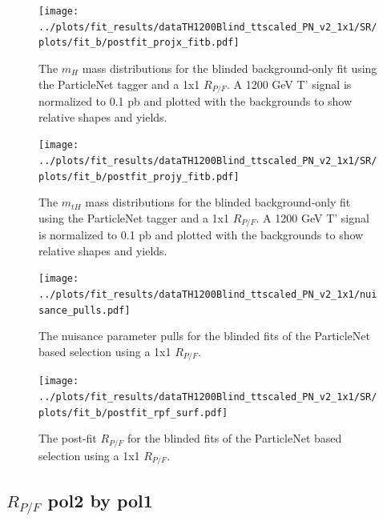 \documentclass[10pt,oneside]{article}
\begin{document}
\begin{figure}[H]
    \centering
    \texttt{[image: ../plots/fit\_results/dataTH1200Blind\_ttscaled\_PN\_v2\_1x1/SR/plots/fit\_b/postfit\_projx\_fitb.pdf]}
    \caption{The $m_H$ mass distributions for the blinded background-only fit using the ParticleNet tagger and a 1x1 $R_{P/F}$.
    A 1200 GeV T' signal is normalized to 0.1 pb and plotted with the backgrounds to show relative shapes and yields.}
    \label{figs:PN_mh_1x1}
\end{figure}
\begin{figure}[H]
    \centering
    \texttt{[image: ../plots/fit\_results/dataTH1200Blind\_ttscaled\_PN\_v2\_1x1/SR/plots/fit\_b/postfit\_projy\_fitb.pdf]}
    \caption{The $m_{tH}$ mass distributions for the blinded background-only fit using the ParticleNet tagger and a 1x1 $R_{P/F}$.
    A 1200 GeV T' signal is normalized to 0.1 pb and plotted with the backgrounds to show relative shapes and yields.}
    \label{figs:PN_mth_1x1}
\end{figure}
\begin{figure}[H]
    \centering
    \texttt{[image: ../plots/fit\_results/dataTH1200Blind\_ttscaled\_PN\_v2\_1x1/nuisance\_pulls.pdf]}
    \caption{The nuisance parameter pulls for the blinded fits of the ParticleNet based selection using a 1x1 $R_{P/F}$.}
    \label{figs:PN_nuis_1x1}
\end{figure}
\begin{figure}[H]
    \centering
    \texttt{[image: ../plots/fit\_results/dataTH1200Blind\_ttscaled\_PN\_v2\_1x1/SR/plots/fit\_b/postfit\_rpf\_surf.pdf]}
    \caption{The post-fit $R_{P/F}$ for the blinded fits of the ParticleNet based selection using a 1x1 $R_{P/F}$.}
    \label{figs:PN_rpf_1x1}
\end{figure}

\subsection{\texorpdfstring{$R_{P/F}$}{Rpf} pol2 by pol1}
\end{document}

